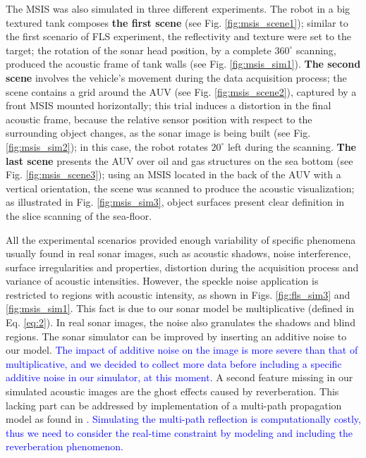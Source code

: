 \documentclass[final,5p,times]{elsarticle}
\begin{document}
The MSIS was also simulated in three different experiments. The robot in a
big textured tank composes \textbf{the first scene} (see Fig.
\ref{fig:msis_scene1}); similar to the first scenario of FLS experiment,
the reflectivity and texture were set to the target; the rotation of the
sonar head position, by a complete $360^{\circ}$ scanning, produced the acoustic
frame of tank walls (see Fig. \ref{fig:msis_sim1}). \textbf{The second scene}
involves the vehicle's movement during the data acquisition process; the scene
contains a grid around the AUV (see Fig. \ref{fig:msis_scene2}), captured by a front MSIS mounted horizontally; this trial induces a distortion in the final
acoustic frame, because the relative sensor position with respect to the
surrounding object changes, as the sonar image is being built (see
Fig. \ref{fig:msis_sim2}); in this case, the robot rotates $20^{\circ}$ left
during the scanning. \textbf{The last scene} presents the AUV over oil
and gas structures on the sea bottom (see Fig. \ref{fig:msis_scene3});
using an MSIS located in the back of the AUV with a vertical orientation, the scene was scanned to produce the acoustic visualization; as illustrated in Fig. \ref{fig:msis_sim3}, object surfaces present clear definition in the slice scanning of the sea-floor.

All the experimental scenarios provided enough variability of specific phenomena usually found in real sonar images, such as acoustic shadows, noise interference, surface irregularities and properties, distortion during the acquisition process and variance of acoustic intensities. However, the speckle noise application is restricted to regions with acoustic intensity, as shown in Figs. \ref{fig:fls_sim3} and \ref{fig:msis_sim1}. This fact is due to our sonar model be multiplicative (defined in Eq. \ref{eq:2}). In real sonar images, the noise also granulates the shadows and blind regions. The sonar simulator can be improved by inserting an additive noise to our model.
\textcolor{blue}{The impact of additive noise on the image is more severe than that of multiplicative, and we decided to collect more data before including a specific additive noise in our simulator, at this moment.} A second feature missing in our simulated acoustic images are the ghost effects caused by reverberation. This lacking part can be addressed by implementation of a multi-path propagation model as found in \textcolor{blue}{\cite{huang2015b}. Simulating the multi-path reflection is computationally costly, thus we need to consider the real-time constraint by modeling and including the reverberation phenomenon.}
\end{document}

